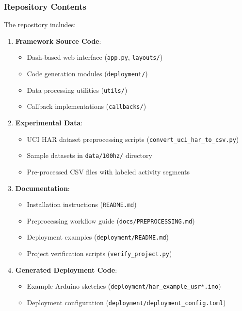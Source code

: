 \subsubsection{Repository Contents}
The repository includes:
\begin{enumerate}
    \item \textbf{Framework Source Code}:
    \begin{itemize}
        \item Dash-based web interface (\texttt{app.py}, \texttt{layouts/})
        \item Code generation modules (\texttt{deployment/})
        \item Data processing utilities (\texttt{utils/})
        \item Callback implementations (\texttt{callbacks/})
    \end{itemize}
    
    \item \textbf{Experimental Data}:
    \begin{itemize}
        \item UCI HAR dataset preprocessing scripts (\texttt{convert\_uci\_har\_to\_csv.py})
        \item Sample datasets in \texttt{data/100hz/} directory
        \item Pre-processed CSV files with labeled activity segments
    \end{itemize}
    
    \item \textbf{Documentation}:
    \begin{itemize}
        \item Installation instructions (\texttt{README.md})
        \item Preprocessing workflow guide (\texttt{docs/PREPROCESSING.md})
        \item Deployment examples (\texttt{deployment/README.md})
        \item Project verification scripts (\texttt{verify\_project.py})
    \end{itemize}
    
    \item \textbf{Generated Deployment Code}:
    \begin{itemize}
        \item Example Arduino sketches (\texttt{deployment/har\_example\_usr*.ino})
        \item Deployment configuration (\texttt{deployment/deployment\_config.toml})
    \end{itemize}
\end{enumerate}

